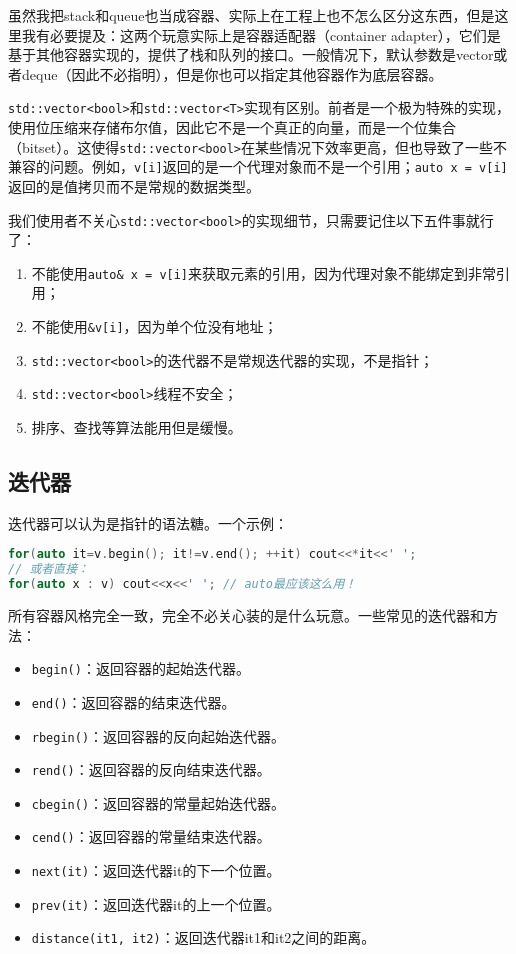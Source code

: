 \documentclass[../main.tex]{subfiles}
\begin{document}
\begin{note}
  虽然我把stack和queue也当成容器、实际上在工程上也不怎么区分这东西，但是这里我有必要提及：这两个玩意实际上是容器适配器（container adapter），它们是基于其他容器实现的，提供了栈和队列的接口。一般情况下，默认参数是vector或者deque（因此不必指明），但是你也可以指定其他容器作为底层容器。
\end{note}

\begin{note}
  \texttt{std::vector<bool>}和\texttt{std::vector<T>}实现有区别。前者是一个极为特殊的实现，使用位压缩来存储布尔值，因此它不是一个真正的向量，而是一个位集合（bitset）。这使得\texttt{std::vector<bool>}在某些情况下效率更高，但也导致了一些不兼容的问题。例如，\texttt{v[i]}返回的是一个代理对象而不是一个引用；\texttt{auto x = v[i]}返回的是值拷贝而不是常规的数据类型。

  我们使用者不关心\texttt{std::vector<bool>}的实现细节，只需要记住以下五件事就行了：
  \begin{enumerate}
    \item 不能使用\texttt{auto\& x = v[i]}来获取元素的引用，因为代理对象不能绑定到非常引用；
    \item 不能使用\texttt{\&v[i]}，因为单个位没有地址；
    \item \texttt{std::vector<bool>}的迭代器不是常规迭代器的实现，不是指针；
    \item \texttt{std::vector<bool>}线程不安全；
    \item 排序、查找等算法能用但是缓慢。
  \end{enumerate}
\end{note}

\subsection{迭代器}

迭代器可以认为是指针的语法糖。一个示例：
\begin{lstlisting}[language=C++]
for(auto it=v.begin(); it!=v.end(); ++it) cout<<*it<<' ';
// 或者直接：
for(auto x : v) cout<<x<<' '; // auto最应该这么用！
\end{lstlisting}

所有容器风格完全一致，完全不必关心装的是什么玩意。一些常见的迭代器和方法：
\begin{itemize}
  \item \texttt{begin()}：返回容器的起始迭代器。
  \item \texttt{end()}：返回容器的结束迭代器。
  \item \texttt{rbegin()}：返回容器的反向起始迭代器。
  \item \texttt{rend()}：返回容器的反向结束迭代器。
  \item \texttt{cbegin()}：返回容器的常量起始迭代器。
  \item \texttt{cend()}：返回容器的常量结束迭代器。
  \item \texttt{next(it)}：返回迭代器it的下一个位置。
  \item \texttt{prev(it)}：返回迭代器it的上一个位置。
  \item \texttt{distance(it1, it2)}：返回迭代器it1和it2之间的距离。
\end{itemize}
\end{document}
